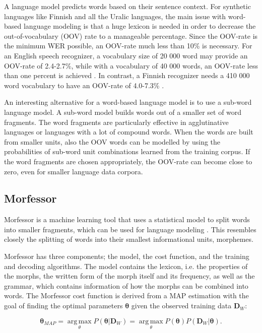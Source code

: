 \documentclass[b5paper]{article}
\newcommand{\ngram}{$n$-gram}
\begin{document}

A language model predicts words based on their sentence context. For synthetic languages like Finnish and all the Uralic languages, the main issue with word-based language modeling is that a huge lexicon is needed in order to decrease the out-of-vocabulary (OOV) rate to a manageable percentage. Since the OOV-rate is the minimum WER possible, an OOV-rate much less than 10\% is necessary. For an English speech recognizer, a vocabulary size of 20 000 word may provide an OOV-rate of 2.4-2.7\%, while with a vocabulary of 40 000 words, an OOV-rate less than one percent is achieved \cite{woodland19951994}. In contrast, a Finnish recognizer needs a 410 000 word vocabulary to have an OOV-rate of 4.0-7.3\% \cite{hirsimaki2006unlimited}.

An interesting alternative for a word-based language model is to use a sub-word language model. A sub-word model builds words out of a smaller set of word fragments. The word fragments are particularly effective in agglutinative languages or languages with a lot of compound words. When the words are built from smaller units, also the OOV words can be modelled by using the probabilities of sub-word unit combinations learned from the training corpus. If the word fragments are chosen appropriately, the OOV-rate can become close to zero, even for smaller language data corpora.

\subsection{Morfessor}
Morfessor is a machine learning tool that uses a statistical model to split words into smaller fragments, which can be used for language modeling \cite{creutz2007unsupervised}. This resembles closely the splitting of words into their smallest informational units, morphemes. 

Morfessor has three components; the model, the cost function, and the training and decoding algorithms. The model contains the lexicon, i.e. the properties of the morphs, the written form of the morph itself and its frequency, as well as the grammar, which contains information of how the morphs can be combined into words. The Morfessor cost function is derived from a MAP estimation with the goal of finding the optimal parameters $\bm{\theta}$ given the observed training data $\bm{D}_W$:

\begin{equation}
\bm{\theta}_{MAP}=\operatorname*{arg\,max}_{\theta}P(\bm{\theta}|\bm{D}_W)=\operatorname*{arg\,max}_{\theta}P(\bm{\theta})P(\bm{D}_W|\bm{\theta}).
\end{equation}
\end{document}
